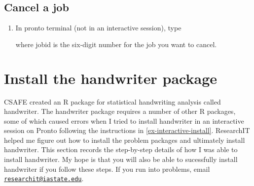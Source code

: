 \documentclass[
]{book}
\newenvironment{Shaded}{\begin{snugshade}}{\end{snugshade}}
\newcommand{\ExtensionTok}[1]{#1}
\newcommand{\NormalTok}[1]{#1}
\begin{document}
\hypertarget{cancel-a-job}{%
\subsection{Cancel a job}\label{cancel-a-job}}

\begin{enumerate}
\def\labelenumi{\arabic{enumi}.}
\item
  In pronto terminal (not in an interactive session), type

\begin{Shaded}
\end{Shaded}

  where jobid is the six-digit number for the job you want to cancel.
\end{enumerate}

\hypertarget{install-the-handwriter-package}{%
\section{Install the handwriter package}\label{install-the-handwriter-package}}

CSAFE created an R package for statistical handwriting analysis called handwriter. The handwriter package requires a number of other R packages, some of which caused errors when I tried to install handwriter in an interactive session on Pronto following the instructions in \ref{ex-interactive-install}. ResearchIT helped me figure out how to install the problem packages and ultimately install handwriter. This section records the step-by-step details of how I was able to install handwriter. My hope is that you will also be able to sucessfully install handwriter if you follow these steps. If you run into problems, email \href{mailto:researchit@iastate.edu}{\nolinkurl{researchit@iastate.edu}}.
\end{document}
